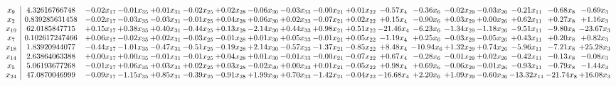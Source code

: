 \documentclass[9pt]{article}
\begin{document}
 \[\begin{array}{c| c c@{\hskip 2pt} c@{\hskip 2pt} c@{\hskip 2pt} c@{\hskip 2pt} c@{\hskip 2pt} c@{\hskip 2pt} c@{\hskip 2pt} c@{\hskip 2pt} c@{\hskip 2pt} c@{\hskip 2pt} c@{\hskip 2pt} c@{\hskip 2pt} c@{\hskip 2pt} c@{\hskip 2pt} c@{\hskip 2pt} c@{\hskip 2pt} }
 x_{9}   &  4.32616766748 & -0.02 x_{17} & -0.01 x_{35} & +  0.01 x_{31} & -0.02 x_{25} & +  0.02 x_{28} & -0.06 x_{30} & -0.03 x_{33} & -0.00 x_{21} & +  0.01 x_{22} & -0.57 x_{4} & -0.36 x_{6} & -0.02 x_{29} & -0.03 x_{26} & -0.21 x_{11} & -0.68 x_{8} & -0.69 x_{3}\\
 x_{2}   &  0.839285631458 & -0.02 x_{17} & -0.03 x_{35} & -0.03 x_{31} & -0.01 x_{25} & +  0.04 x_{28} & +  0.06 x_{30} & +  0.02 x_{33} & -0.07 x_{21} & +  0.02 x_{22} & +  0.15 x_{4} & -0.90 x_{6} & +  0.03 x_{29} & +  0.00 x_{26} & +  0.62 x_{11} & +  0.27 x_{8} & +  1.16 x_{3}\\
 x_{19}   &  62.0185847715 & +  0.15 x_{17} & +  0.38 x_{35} & +  0.40 x_{31} & -0.44 x_{25} & +  0.13 x_{28} & -2.14 x_{30} & +  0.44 x_{33} & +  0.98 x_{21} & +  0.51 x_{22} & -21.46 x_{4} & -6.23 x_{6} & -1.34 x_{29} & -1.18 x_{26} & -9.51 x_{11} & -9.80 x_{8} & -23.67 x_{3}\\
 x_{7}   &  0.102617247466 & +  0.06 x_{17} & -0.02 x_{35} & +  0.02 x_{31} & -0.03 x_{25} & -0.01 x_{28} & +  0.01 x_{30} & +  0.05 x_{33} & -0.01 x_{21} & +  0.05 x_{22} & -1.19 x_{4} & +  0.25 x_{6} & -0.03 x_{29} & -0.05 x_{26} & +  0.43 x_{11} & +  0.20 x_{8} & +  0.82 x_{3}\\
 x_{18}   &  1.83920944077 & -0.44 x_{17} & -1.01 x_{35} & -0.47 x_{31} & -0.51 x_{25} & -0.19 x_{28} & +  2.14 x_{30} & -0.57 x_{33} & -1.37 x_{21} & -0.85 x_{22} & +  8.48 x_{4} & -10.94 x_{6} & +  1.32 x_{29} & +  0.74 x_{26} & -5.96 x_{11} & -7.21 x_{8} & + 25.28 x_{3}\\
 x_{14}   &  2.63864063388 & +  0.00 x_{17} & +  0.00 x_{35} & -0.01 x_{31} & -0.01 x_{25} & +  0.04 x_{28} & +  0.01 x_{30} & -0.01 x_{33} & -0.00 x_{21} & -0.07 x_{22} & +  0.67 x_{4} & -0.28 x_{6} & -0.01 x_{29} & +  0.02 x_{26} & -0.42 x_{11} & -0.13 x_{8} & -0.08 x_{3}\\
 x_{5}   &  5.06193677268 & -0.01 x_{17} & +  0.06 x_{35} & +  0.03 x_{31} & +  0.02 x_{25} & +  0.03 x_{28} & -0.02 x_{30} & +  0.00 x_{33} & +  0.01 x_{21} & -0.05 x_{22} & +  0.98 x_{4} & +  0.69 x_{6} & -0.06 x_{29} & -0.01 x_{26} & -0.93 x_{11} & -0.79 x_{8} & -1.44 x_{3}\\
 x_{24}   &  47.0870046999 & -0.09 x_{17} & -1.15 x_{35} & +  0.85 x_{31} & -0.39 x_{25} & -0.91 x_{28} & +  1.99 x_{30} & +  0.70 x_{33} & -1.42 x_{21} & -0.04 x_{22} & -16.68 x_{4} & +  2.20 x_{6} & +  1.09 x_{29} & -0.60 x_{26} & -13.32 x_{11} & -21.74 x_{8} & + 16.08 x_{3}\\

\end{array}\]
\end{document}
